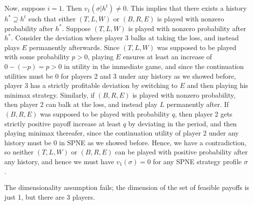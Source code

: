 \documentclass[10pt,letter]{article}
\begin{document}
Now, suppose $i = 1$. Then $v_1(\sigma | h^t) \neq 0$. This implies that there exists a history $h^* \supseteq h^t$ such that either $(T,L,W)$ or $(B,R,E)$ is played with nonzero probability after $h^*$. Suppose $(T,L,W)$ is played with nonzero probability after $h^*$. Consider the deviation where player 3 balks at taking the loss, and instead plays $E$ permanently afterwards. Since $(T,L,W)$ was supposed to be played with some probability $p > 0$, playing $E$ ensures at least an increase of $0 - (-p) = p > 0$ in utility in the immediate game, and since the continuation utilities must be $0$ for players 2 and 3 under any history as we showed before, player 3 has a strictly profitable deviation by switching to $E$ and then playing his minimax strategy. Similarly, if $(B,R,E)$ is played with nonzero probability, then player 2 can balk at the loss, and instead play $L$ permanently after. If $(B,R,E)$ was supposed to be played with probability $q$, then player 2 gets strictly positive payoff increase at least $q$ by deviating in the period, and then playing minimax thereafer, since the continuation utility of player 2 under any history must be 0 in SPNE as we showed before.
Hence, we have a contradiction, so neither $(T,L,W)$ or $(B,R,E)$ can be played with positive probability after any history, and hence we must have $v_1(\sigma) = 0$ for any SPNE strategy profile $\sigma$.

The dimensionality assumption fails; the dimension of the set of feasible payoffs is just 1, but there are 3 players.
\end{document}
